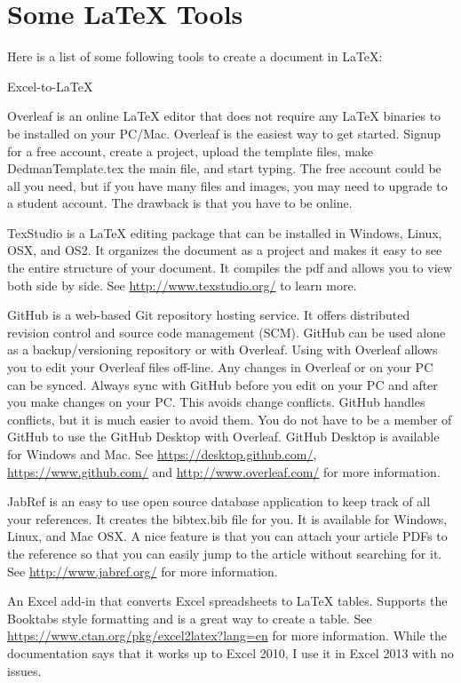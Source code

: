 \documentclass[a4paper]{article}
\begin{document}
\section{Some \LaTeX {}{} Tools} \label{sec:tools}

Here is a list of some following tools to create a document in \LaTeX {}:

\begin{labeling}{Excel-to-\LaTeX {}} %
	\item[Overleaf.com] Overleaf is an online \LaTeX {} editor that does not require any \LaTeX {} binaries to be installed on your PC/Mac.  Overleaf is the easiest way to get started. Signup for a free account, create a project, upload the template files, make DedmanTemplate.tex the main file, and start typing.  The free account could be all you need, but if you have many files and images, you may need to upgrade to a student account. The drawback is that you have to be online.
    \item[TexStudio] TexStudio is a \LaTeX {} editing package that can be installed in Windows, Linux, OSX, and OS2.  It organizes the document as a project and makes it easy to see the entire structure of your document.  It compiles the pdf and allows you to view both side by side.  See \url{http://www.texstudio.org/} to learn more.
 	\item[GitHub] GitHub is a web-based Git repository hosting service. It offers distributed revision control and source code management (SCM).  GitHub can be used alone as a backup/versioning repository or with Overleaf.  Using with Overleaf allows you to edit your Overleaf files off-line.  Any changes in Overleaf or on your PC can be synced.  Always sync with GitHub before you edit on your PC and after you make changes on your PC. This avoids change conflicts.  GitHub handles conflicts, but it is much easier to avoid them.  You do not have to be a member of GitHub to use the GitHub Desktop with Overleaf.  GitHub Desktop is available for Windows and Mac. See \url{https://desktop.github.com/},  \url{https://www.github.com/} and  \url{http://www.overleaf.com/} for more information.
    \item[JabRef] JabRef is an easy to use open source database application to keep track of all your references.  It creates the bibtex.bib file for you. It is available for Windows, Linux, and Mac OSX. A nice feature is that you can attach your article PDFs to the reference so that you can easily jump to the article without searching for it.  See \url{http://www.jabref.org/} for more information.
    \item[Excel-to-\LaTeX {}] An Excel add-in that converts Excel spreadsheets to \LaTeX {} tables. Supports the Booktabs style formatting and is a great way to create a table.  See \url{https://www.ctan.org/pkg/excel2latex?lang=en} for more information.  While the documentation says that it works up to Excel 2010, I use it in Excel 2013 with no issues.
\end{labeling}
\end{document}
